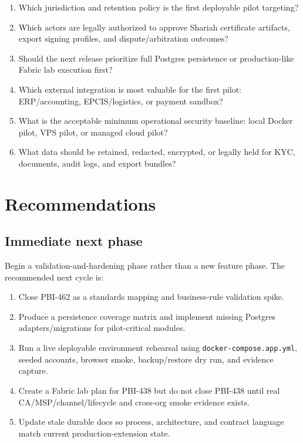 \documentclass[11pt,a4paper]{article}
\newcommand{\repo}[1]{\texttt{#1}}
\begin{document}
\begin{enumerate}
  \item Which jurisdiction and retention policy is the first deployable pilot targeting?
  \item Which actors are legally authorized to approve Shariah certificate artifacts, export signing profiles, and dispute/arbitration outcomes?
  \item Should the next release prioritize full Postgres persistence or production-like Fabric lab execution first?
  \item Which external integration is most valuable for the first pilot: ERP/accounting, EPCIS/logistics, or payment sandbox?
  \item What is the acceptable minimum operational security baseline: local Docker pilot, VPS pilot, or managed cloud pilot?
  \item What data should be retained, redacted, encrypted, or legally held for KYC, documents, audit logs, and export bundles?
\end{enumerate}

\section{Recommendations}

\subsection{Immediate next phase}

Begin a validation-and-hardening phase rather than a new feature phase. The recommended next cycle is:

\begin{enumerate}
  \item Close PBI-462 as a standards mapping and business-rule validation spike.
  \item Produce a persistence coverage matrix and implement missing Postgres adapters/migrations for pilot-critical modules.
  \item Run a live deployable environment rehearsal using \repo{docker-compose.app.yml}, seeded accounts, browser smoke, backup/restore dry run, and evidence capture.
  \item Create a Fabric lab plan for PBI-438 but do not close PBI-438 until real CA/MSP/channel/lifecycle and cross-org smoke evidence exists.
  \item Update stale durable docs so process, architecture, and contract language match current production-extension state.
\end{enumerate}
\end{document}
